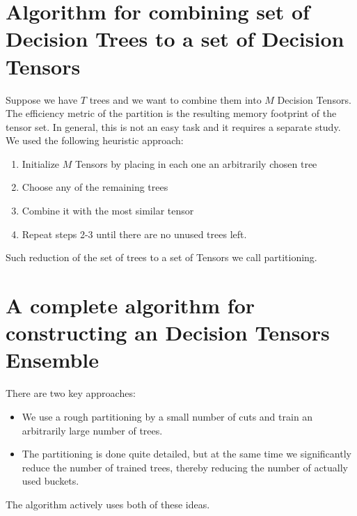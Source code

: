 \documentclass[a4paper]{jpconf}
\begin{document}
\section{Algorithm for combining set of Decision Trees to a set of Decision Tensors}
Suppose we have $T$ trees and we want to combine them into $M$ Decision Tensors. The efficiency metric of the partition is the resulting memory footprint of the tensor set.
In general, this is not an easy task and it requires a separate study. We used the following heuristic approach:
\medskip
\renewcommand{\theenumi}{\arabic{enumi}}
\begin{enumerate}
\item Initialize $M$ Tensors by placing in each one an arbitrarily chosen tree
\item Choose any of the remaining trees
\item Combine it with the most similar tensor
\item Repeat steps 2-3 until there are no unused trees left.
\end{enumerate}
Such reduction of the set of trees to a set of Tensors we call partitioning.

\section{A complete algorithm for constructing an Decision Tensors Ensemble}

There are two key approaches:

\medskip
\begin{itemize}
\item We use a rough partitioning by a small number of cuts and train an arbitrarily large number of trees.
\item The partitioning is done quite detailed, but at the same time we significantly reduce the number of trained trees, thereby reducing the number of actually used buckets.
\end{itemize}

The algorithm actively uses both of these ideas.
\end{document}
